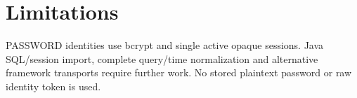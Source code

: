 \documentclass[a4paper]{arrowhead}
\begin{document}
\section{Limitations}
PASSWORD identities use bcrypt and single active opaque sessions. Java SQL/session import, complete query/time normalization and alternative framework transports require further work. No stored plaintext password or raw identity token is used.
\end{document}
